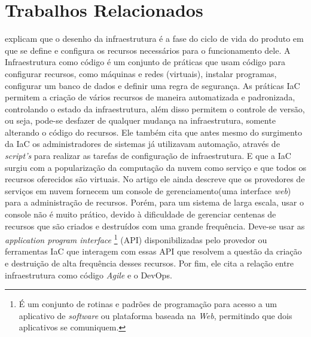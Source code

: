 \section{\esp Trabalhos Relacionados} \label{relacionados}


 explicam que o desenho da infraestrutura é a fase do ciclo de vida do produto em que se define e configura os recursos necessários para o funcionamento dele. A Infraestrutura como código é um conjunto de práticas que usam código para configurar recursos, como máquinas e redes (virtuais), instalar programas, configurar um banco de dados e definir uma regra de segurança. As práticas IaC permitem a criação de vários recursos de maneira automatizada e padronizada, controlando o estado da infraestrutura, além disso permitem o controle de versão, ou seja, pode-se desfazer de qualquer mudança na infraestrutura, somente alterando o código do recursos. Ele também cita que antes mesmo do surgimento da IaC os administradores de sistemas já utilizavam automação, através de \textit{script's} para realizar as tarefas de configuração de infraestrutura. E que a IaC surgiu com a popularização da computação da nuvem como serviço e que todos os recursos oferecidos são virtuais. No artigo ele ainda descreve que os provedores de serviços em nuvem fornecem um console de gerenciamento(uma interface \textit{web}) para a administração de recursos. Porém, para um sistema de larga escala, usar o console não é muito prático, devido à dificuldade de gerenciar centenas de recursos que são criados e destruídos com uma grande frequência. Deve-se usar as \textit{application program interface} \footnote{É um conjunto de rotinas e padrões de programação para acesso a um aplicativo de \textit{software} ou plataforma baseada na \textit{Web}, permitindo que dois aplicativos se comuniquem. } (API) disponibilizadas pelo provedor ou ferramentas IaC que interagem com essas API que resolvem a questão da criação e destruição de alta frequência desses recursos. Por fim, ele cita a relação entre infraestrutura como código \textit{Agile} e o DevOps. 

\hfill

